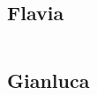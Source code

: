 \subsection*{Flavia}
\begin{table}[H]
    \begin{tabular}{lr}
        \toprule
        
        \bottomrule
    \end{tabular}
\end{table}

\subsection*{Gianluca}
\begin{table}[H]
    \begin{tabular}{lr}
        \toprule
        
        \bottomrule
    \end{tabular}
\end{table}